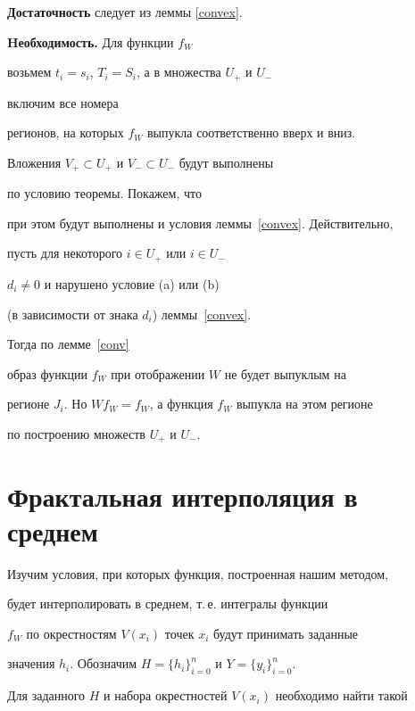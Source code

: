 \begin{pf}


{\bf Достаточность} следует из леммы \ref{convex}.





{\bf Hеобходимость.} Для функции $f_W$


возьмем $t_i= s_i$, $T_i= S_i$, а в множества $ U_+ $ и $ U_- $


включим все номера


регионов, на которых $f_W$ выпукла соответственно вверх и вниз.


Вложения $V_+ \subset U_+ $ и $V_- \subset U_- $ будут выполнены


по условию теоремы. Покажем, что


при этом будут выполнены и условия леммы~\ref{convex}. Действительно,


пусть для некоторого $i\in U_+$ или $i\in U_-$


$d_i \ne 0 $ и нарушено условие (a) или (b)


(в зависимости от знака $d_i$) леммы~\ref{convex}.


Тогда по лемме~\ref{conv}


образ функции $f_W$ при отображении $W$ не будет выпуклым на


регионе $J_i$. Но $ W f_W = f_W $, а функция $f_W$ выпукла на этом регионе


по построению множеств $U_+$ и $U_-$.


\end{pf}





\section{Фрактальная интерполяция в среднем}





Изучим условия, при которых функция, построенная нашим методом,


будет интерполировать в среднем, т.\,е. интегралы функции


$f_W$ по окрестностям $V(x_i)$ точек $x_i$ будут принимать заданные


значения $h_i$. Обозначим $ H = \{h_i\}_{i=0}^n$ и $ Y = \{y_i\}_{i=0}^n$.


Для заданного $H$ и набора окрестностей $V(x_i)$ необходимо найти такой


